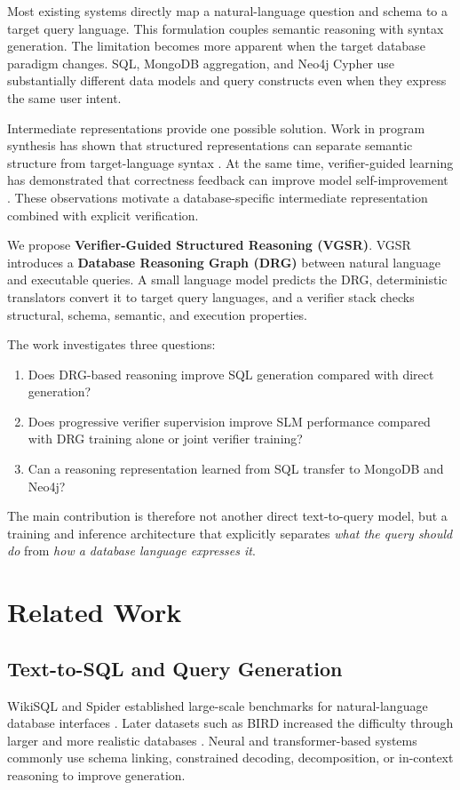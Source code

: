 \documentclass[conference]{IEEEtran}
\begin{document}
Most existing systems directly map a natural-language question and schema to a target query language. This formulation couples semantic reasoning with syntax generation. The limitation becomes more apparent when the target database paradigm changes. SQL, MongoDB aggregation, and Neo4j Cypher use substantially different data models and query constructs even when they express the same user intent.

Intermediate representations provide one possible solution. Work in program synthesis has shown that structured representations can separate semantic structure from target-language syntax \cite{b11}. At the same time, verifier-guided learning has demonstrated that correctness feedback can improve model self-improvement \cite{b13}. These observations motivate a database-specific intermediate representation combined with explicit verification.

We propose \textbf{Verifier-Guided Structured Reasoning (VGSR)}. VGSR introduces a \textbf{Database Reasoning Graph (DRG)} between natural language and executable queries. A small language model predicts the DRG, deterministic translators convert it to target query languages, and a verifier stack checks structural, schema, semantic, and execution properties.

The work investigates three questions:
\begin{enumerate}
\item Does DRG-based reasoning improve SQL generation compared with direct generation?
\item Does progressive verifier supervision improve SLM performance compared with DRG training alone or joint verifier training?
\item Can a reasoning representation learned from SQL transfer to MongoDB and Neo4j?
\end{enumerate}

The main contribution is therefore not another direct text-to-query model, but a training and inference architecture that explicitly separates \emph{what the query should do} from \emph{how a database language expresses it}.

\section{Related Work}
\subsection{Text-to-SQL and Query Generation}
WikiSQL and Spider established large-scale benchmarks for natural-language database interfaces \cite{b1,b2}. Later datasets such as BIRD increased the difficulty through larger and more realistic databases \cite{b3}. Neural and transformer-based systems commonly use schema linking, constrained decoding, decomposition, or in-context reasoning to improve generation.
\end{document}
